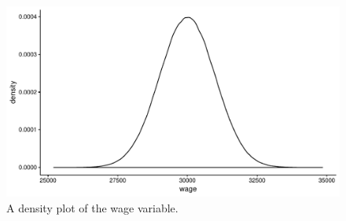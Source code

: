 \documentclass[]{book}\usepackage[]{graphicx}\usepackage[]{color}
\makeatletter
\def\maxwidth{ %
  \ifdim\Gin@nat@width>\linewidth
    \linewidth
  \else
    \Gin@nat@width
  \fi
}
\newenvironment{knitrout}{}{} %
\makeatother
\begin{document}
\begin{knitrout}
\color{fgcolor}\begin{figure}

{\centering \includegraphics[width=\maxwidth]{figure/densitywages-1} 

}

\caption[A density plot of the wage variable]{A density plot of the wage variable.}\label{fig:densitywages}
\end{figure}


\end{knitrout}





% 
\end{document}
